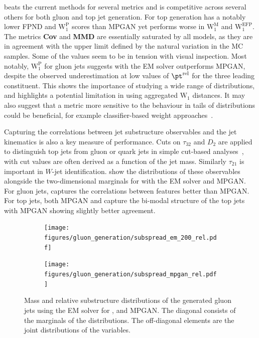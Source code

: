 \pcjedi beats the current methods for several metrics and is competitive across several others for both gluon and top jet generation.
For top generation \pcjedi has a notably lower FPND and $\mathrm{W_1^{P}}$ scores than MPGAN yet performs worse in $\mathrm{W_1^{M}}$ and $\mathrm{W_1^{EFP}}$.
The metrics \textbf{Cov} and \textbf{MMD} are essentially saturated by all models, as they are in agreement with the upper limit defined by the natural variation in the MC samples.
Some of the values seem to be in tension with visual inspection.
Most notably, $\mathrm{W_1^{P}}$ for gluon jets suggests \pcjedi with the EM solver outperforms MPGAN, despite the observed underestimation at low values of $\pt^{\text{rel}}$ for the three leading constituent.
This shows the importance of studying a wide range of distributions, and highlights a potential limitation in using aggregated $\mathrm{W_1}$ distances.
It may also suggest that a metric more sensitive to the behaviour in tails of distributions could be beneficial, for example classifier-based weight approaches~\cite{Das:2023ktd}.

Capturing the correlations between jet substructure observables and the jet kinematics is also a key measure of performance.
Cuts on $\tau_{32}$ and $D_{2}$ are applied to distinguish top jets from gluon or quark jets in simple cut-based analyses~\cite{ATLAS:2018wis,CMS:2020poo}, with cut values are often derived as a function of the jet mass.
Similarly $\tau_{21}$ is important in $W$-jet identification.
 show the distributions of these observables alongside the two-dimensional marginals for \pcjedi with the EM solver and MPGAN.
For gluon jets, \pcjedi captures the correlations between features better than MPGAN.
For top jets, both MPGAN and \pcjedi capture the bi-modal structure of the top jets with MPGAN showing slightly better agreement.

\begin{figure}[hbpt]
    \begin{subfigure}{0.5\textwidth}
        \centering
        \texttt{[image: figures/gluon\_generation/subspread\_em\_200\_rel.pdf]}
    \end{subfigure}%
    \begin{subfigure}{0.5\textwidth}
        \centering
        \texttt{[image: figures/gluon\_generation/subspread\_mpgan\_rel.pdf]}
    \end{subfigure}%
    \caption{Mass and relative substructure distributions of the generated gluon jets using the EM solver for \pcjedi, and MPGAN. The diagonal consists of the marginals of the distributions. The off-diagonal elements are the joint distributions of the variables.}
    \label{fig:gluon_correlations}
\end{figure}

